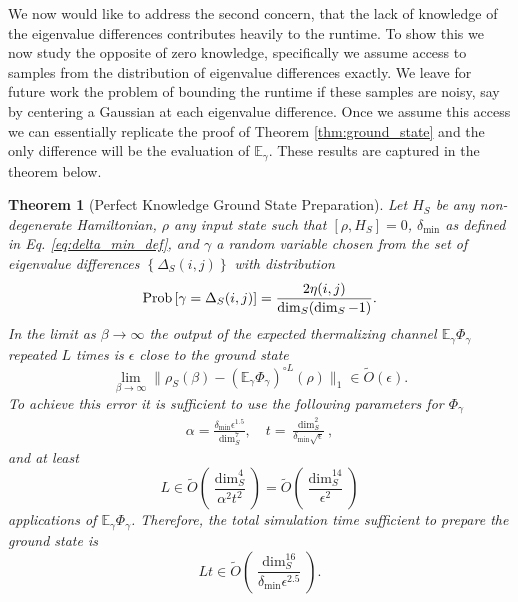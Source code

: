 \documentclass{article}
\newtheorem{theorem}{Theorem}
\newcommand{\parens}[1]{\left( #1 \right)}
\newcommand{\norm}[1]{\| #1 \|}
\newcommand{\set}[1]{\left\{ #1 \right\}}
\newcommand{\EE}{\mathbb{E}}
\newcommand{\prob}[1]{{\rm Prob}\left[ #1 \right]}
\begin{document}
We now would like to address the second concern, that the lack of knowledge of the eigenvalue differences contributes heavily to the runtime. To show this we now study the opposite of zero knowledge, specifically we assume access to samples from the distribution of eigenvalue differences exactly. We leave for future work the problem of bounding the runtime if these samples are noisy, say by centering a Gaussian at each eigenvalue difference. Once we assume this access we can essentially replicate the proof of Theorem \ref{thm:ground_state} and the only difference will be the evaluation of $\EE_\gamma$. These results are captured in the theorem below.
\begin{theorem}[Perfect Knowledge Ground State Preparation] \label{thm:ground_state_prep_perfect}
    Let $H_S$ be any non-degenerate Hamiltonian, $\rho$ any input state such that $[\rho, H_S] = 0$, $\delta_{\min}$ as defined in Eq. \eqref{eq:delta_min_def}, and $\gamma$ a random variable chosen from the set of eigenvalue differences $\set{\Delta_S(i,j)}$ with distribution
    \begin{equation}
        \prob{\gamma = \Delta_S(i, j)}  = \frac{2 \eta(i,j)}{\dim_S(\dim_S - 1)}.
    \end{equation}
    In the limit as $\beta \to \infty$ the output of the expected thermalizing channel $\EE_\gamma \Phi_\gamma$ repeated $L$ times is $\epsilon$ close to the ground state
    \begin{equation}
        \lim_{\beta \to \infty} \norm{\rho_S(\beta) - (\EE_\gamma \Phi_\gamma)^{\circ L} (\rho)}_1 \in \widetilde{O}(\epsilon).
    \end{equation}
    To achieve this error it is sufficient to use the following parameters for $\Phi_{\gamma}$
    \begin{align}
        \alpha = \frac{\delta_{\min} \epsilon^{1.5}}{\dim_S^7 }, \quad t = \frac{\dim_S^2 }{\delta_{\min} \sqrt{\epsilon}},
    \end{align}
    and at least 
    \begin{equation}
        L \in \widetilde{O} \parens{\frac{\dim_S^4}{\alpha^2 t^2}} = \widetilde{O} \parens{\frac{\dim_S^{14}}{\epsilon^2}}
    \end{equation}
    applications of $\EE_\gamma \Phi_\gamma$.
    Therefore, the total simulation time sufficient to prepare the ground state is
    \begin{equation}
        Lt \in \widetilde{O}\parens{\frac{\dim_S^{16} }{\delta_{\min} \epsilon^{2.5}}}.
    \end{equation}
\end{theorem}
\end{document}

